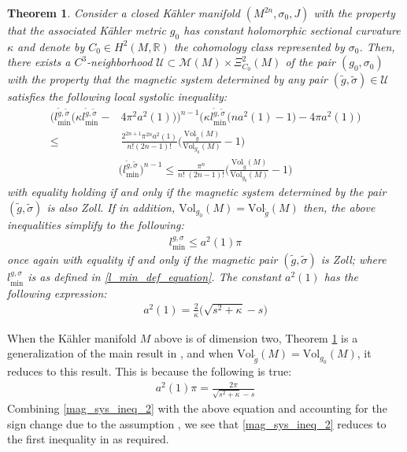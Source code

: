 \documentclass[11pt]{amsart}
\theoremstyle{plain}
\newtheorem{theorem}{Theorem}[section]
\theoremstyle{definition}
\theoremstyle{remark}
\begin{document}
\begin{theorem}\label{mag_sys_ineq}
Consider a closed K\"ahler manifold $(M^{2n},\sigma_0,J)$ with the property that the associated K\"ahler metric $g_0$ has constant holomorphic sectional curvature $\kappa$ and denote by $C_0 \in H^2(M,\mathbb{R})$ the cohomology class represented by $\sigma_0$. Then, there exists a $C^3$-neighborhood $\mathcal{U} \subset \mathcal{M}(M) \times \Xi^2_{C_0}(M) $ of the pair $(g_0,\sigma_0)$ with the property that the magnetic system determined by any pair $(\tilde g,\tilde \sigma) \in \mathcal{U}$ satisfies the following local systolic inequality:
\begin{align}
    \Bigg(
        l_{\text{min}}^{\tilde g,\tilde \sigma}
        \Big(
            \kappa l_{\text{min}}^{\tilde g,\tilde \sigma}
            -&4\pi^2 a^2(1)
        \Big)
    \Bigg)^{n-1}
    \Bigg(
        \kappa l_{\text{min}}^{\tilde g,\tilde \sigma}
        \big(na^2(1)-1\big)
        -4\pi  a^2(1)
    \Bigg) \\\nonumber \leq& \frac{2^{2n+1}\pi^{2n}a^2(1)}{n!(2n-1)!} \Bigg(\frac{\text{Vol}_{\tilde g}(M)}{\text{Vol}_{g_0}(M)}-1\Bigg)
\end{align}
\begin{align}
     \Big(l_{\text{min}}^{\tilde g,\tilde \sigma}\Big)^{n-1} \leq \frac{\pi^n}{n!\;(2n-1)! }\Bigg(\frac{\text{Vol}_{\tilde g}(M)}{\text{Vol}_{g_0}(M)}-1\Bigg)
\end{align}
with equality holding if and only if the magnetic system determined by the pair $(\tilde g,\tilde \sigma)$ is also Zoll. If in addition, $\text{Vol}_{g_0}(M) = \text{Vol}_{\tilde g}(M)$ then, the above inequalities simplify to the following:
   \begin{align}\label{mag_sys_ineq_2}
  l_{\text{min}}^{g, \sigma} \leq a^2(1)\pi
   \end{align}
   once again with equality if and only if the magnetic pair $(\tilde g,\tilde \sigma)$ is Zoll; where $l_{\text{min}}^{g,\sigma}$ is as defined in \eqref{l_min_def_equation}. The constant $a^2(1)$ has the following expression:
   \begin{align}
    a^2(1)= \frac{2}{\kappa}\Big(\sqrt{s^2+\kappa} -s\Big) 
\end{align}
   \end{theorem}
When the K\"ahler manifold $M$ above is of dimension two, Theorem \ref{mag_sys_ineq} is a generalization of the main result in \cite{benedetti2019local}, and when $\text{Vol}_{\tilde g}(M) = \text{Vol}_{g_0}(M)$, it reduces to this result. This is because the following is true:
\begin{align}\label{bk_mag_3}
    a^2(1)\pi = \frac{2\pi}{\sqrt{s^2+\kappa}-s}
\end{align}
Combining \eqref{mag_sys_ineq_2} with the above equation and accounting for the sign change due to the assumption \cite[Equation (1.1)]{benedetti2019local}, we see that \eqref{mag_sys_ineq_2} reduces to the first inequality in \cite[Theorem 1.9]{benedetti2019local} as required.
\end{document}
